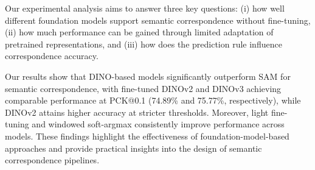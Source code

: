 Our experimental analysis aims to answer three key questions: (i) how well different foundation models support semantic correspondence without
fine-tuning, (ii) how much performance can be gained through limited adaptation of pretrained representations, and (iii) how does the prediction rule
influence correspondence accuracy.

Our results show that DINO-based models significantly outperform SAM for semantic correspondence, with fine-tuned
DINOv2 and DINOv3 achieving comparable performance at PCK@0.1 (74.89\% and 75.77\%, respectively), while DINOv2 attains higher accuracy at stricter
thresholds. Moreover, light fine-tuning and windowed soft-argmax consistently improve performance across models. These findings highlight the
effectiveness of foundation-model-based approaches and provide practical insights into the design of semantic correspondence pipelines.

